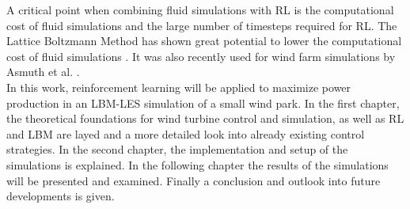 A critical point when combining fluid simulations with RL is the computational cost of fluid simulations and the large number of timesteps required for RL. The Lattice Boltzmann Method has shown great potential to lower the computational cost of fluid simulations \cite{lohner_towards_2019}. It was also recently used for wind farm simulations by Asmuth et al. \cite{asmuth_actuator_2019}.\\
In this work, reinforcement learning will be applied to maximize power production in an LBM-LES simulation of a small wind park. In the first chapter, the theoretical foundations for wind turbine control and simulation, as well as RL and LBM are layed and a more detailed look into already existing control strategies. In the second chapter, the implementation and setup of the simulations is explained. In the following chapter the results of the simulations will be presented and examined. Finally a conclusion and outlook into future developments is given.